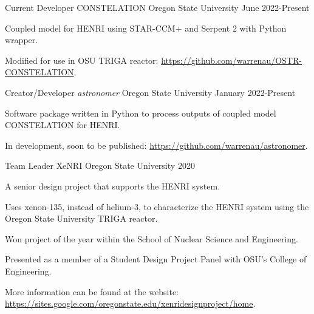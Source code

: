 
\begin{cventries}
  \cventry
    {Current Developer}      %
    {CONSTELATION}           %
    {Oregon State University}%
    {June 2022-Present}   %
    {
    \begin{cvitems}
        \item{Coupled model for HENRI using STAR-CCM+ and Serpent 2 with Python wrapper.}%
        \item{Modified for use in OSU TRIGA reactor: \href{https://github.com/warrenau/OSTR-CONSTELATION}{https://github.com/warrenau/OSTR-CONSTELATION}.}
    \end{cvitems}
    }


  \cventry
    {Creator/Developer}                %
    {\textit{astronomer}}             %
    {Oregon State University}%
    {January 2022-Present}   %
    {
    \begin{cvitems}
        \item{Software package written in Python to process outputs of coupled model CONSTELATION for HENRI.}
        \item{In development, soon to be published: \href{https://github.com/warrenau/astronomer}{https://github.com/warrenau/astronomer}.}
    \end{cvitems}
    }

  
  \cventry
    {Team Leader} %
    {XeNRI} %
    {Oregon State University} %
    {2020} %
    {
      \begin{cvitems} %
        \item{A senior design project that supports the HENRI system.}
		\item {Uses xenon-135, instead of helium-3, to characterize the HENRI system using the Oregon State University TRIGA reactor.}
		\item {Won project of the year within the School of Nuclear Science and Engineering.}
		\item{Presented as a member of a Student Design Project Panel with OSU's College of Engineering.}
        \item{More information can be found at the website: \href{https://sites.google.com/oregonstate.edu/xenridesignproject/home}{https://sites.google.com/oregonstate.edu/xenridesignproject/home}.}
      \end{cvitems}
    }



\end{cventries}
